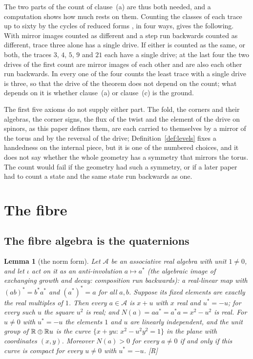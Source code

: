 \documentclass[11pt,a4paper]{article}
\theoremstyle{plain}
\newtheorem{lemma}[theorem]{Lemma}
\theoremstyle{definition}
\theoremstyle{remark}
\newcommand{\rigR}{[\textup{R}]}
\begin{document}
The two parts of the count of clause~(a) are thus both needed, and a computation shows how much rests on them. Counting the classes of each trace up to sixty by the cycles of reduced forms \cite{Gauss1801}, in four ways, gives the following. With mirror images counted as different and a step run backwards counted as different, trace three alone has a single drive. If either is counted as the same, or both, the traces $3$, $4$, $5$, $9$ and $21$ each have a single drive; at the last four the two drives of the first count are mirror images of each other and are also each other run backwards. In every one of the four counts the least trace with a single drive is three, so that the drive of the theorem does not depend on the count; what depends on it is whether clause~(a) or clause~(c) is the ground.

The first five axioms do not supply either part. The fold, the corners and their algebras, the corner signs, the flux of the twist and the element of the drive on spinors, as this paper defines them, are each carried to themselves by a mirror of the torus and by the reversal of the drive; Definition~\ref{def:levels} fixes a handedness on the internal piece, but it is one of the numbered choices, and it does not say whether the whole geometry has a symmetry that mirrors the torus. The count would fail if the geometry had such a symmetry, or if a later paper had to count a state and the same state run backwards as one.

\section{The fibre}\label{sec:fibre}

\subsection{The fibre algebra is the quaternions}

\begin{lemma}[the norm form]\label{lem:norm}
Let $\mathcal{A}$ be an associative real algebra with unit $1\neq0$, and let $\iota$ act on it as an anti-involution $a\mapsto a^{*}$ (the algebraic image of exchanging growth and decay: composition run backwards): a real-linear map with $(ab)^{*}=b^{*}a^{*}$ and $(a^{*})^{*}=a$ for all $a,b$. Suppose its fixed elements are exactly the real multiples of $1$. Then every $a\in\mathcal{A}$ is $x+u$ with $x$ real and $u^{*}=-u$; for every such $u$ the square $u^{2}$ is real; and $N(a)=aa^{*}=a^{*}a=x^{2}-u^{2}$ is real. For $u\neq0$ with $u^{*}=-u$ the elements $1$ and $u$ are linearly independent, and the unit group of $\mathbb{R}\oplus\mathbb{R} u$ is the curve $\{x+yu:\,x^{2}-u^{2}y^{2}=1\}$ in the plane with coordinates $(x,y)$. Moreover $N(a)>0$ for every $a\neq0$ if and only if this curve is compact for every $u\neq0$ with $u^{*}=-u$. \rigR
\end{lemma}
\end{document}
